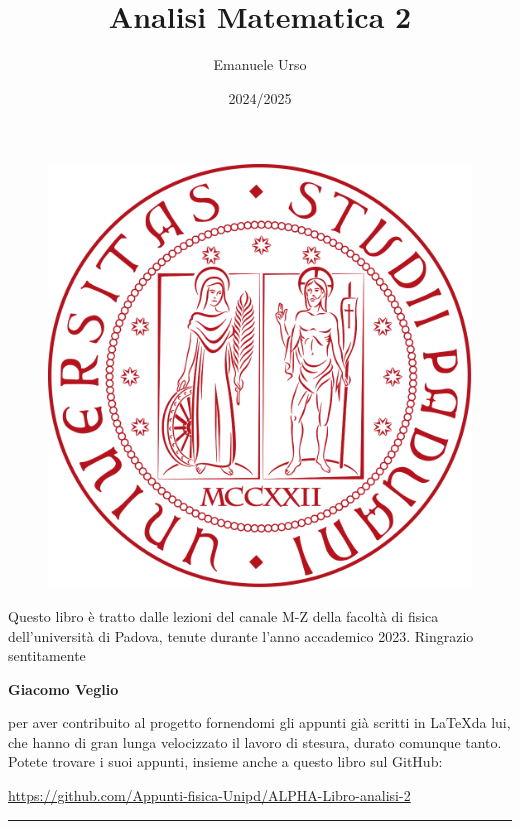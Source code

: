\documentclass[a4paper]{article}
\begin{document}
	

	
	\title{\Huge Analisi Matematica 2}
	\author{{\Large Emanuele Urso} \\
	{\small{\href{mailto:emanuele.urso@studenti.unipd.it}{\color{black}{emanuele.urso@studenti.unipd.it} }}}}
	\date{2024/2025}
	\maketitle
	
	\begin{figure}[!h]
		\centering
		\includegraphics[width=0.5\linewidth]{header/UniPdlogo.png}
	\end{figure}
	
	\vfill
	
	Questo libro è tratto dalle lezioni del canale M-Z della facoltà di fisica dell'università di Padova, tenute durante l'anno accademico 2023. Ringrazio sentitamente
	
	{\centering \large \textbf{Giacomo Veglio} \par}
	
	per aver contribuito al progetto fornendomi gli appunti già scritti in \LaTeX da lui, che hanno di gran lunga velocizzato il lavoro di stesura, durato comunque tanto. Potete trovare i suoi appunti, insieme anche a questo libro sul GitHub: 
	
	{\centering \color{blue} \url{https://github.com/Appunti-fisica-Unipd/ALPHA-Libro-analisi-2} \par} 
	
	\vspace{5em}
	
	
	\begin{center}
		\rule{.9\textwidth}{0.4pt}%
	\end{center}
	
	\hypersetup{linkcolor=black}
	\tableofcontents   
	
\end{document}
